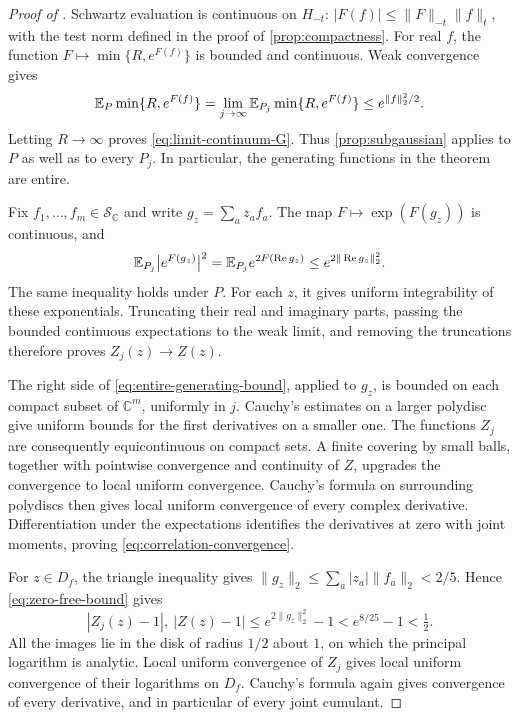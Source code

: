 \begin{proof}[Proof of ]
Schwartz evaluation is continuous on $H_{-t}$:
$|F(f)|\le\|F\|_{-t}\|f\|_t$, with the test norm
defined in the proof of \cref{prop:compactness}.
For real $f$, the function $F\mapsto\min\{R,e^{F(f)}\}$
is bounded and continuous. Weak convergence gives
\[
 \mathbb E_P\min\{R,e^{F(f)}\}
 =\lim_{j\to\infty}\mathbb E_{P_j}\min\{R,e^{F(f)}\}
 \le e^{\|f\|_2^2/2}.
\]
Letting $R\to\infty$ proves \eqref{eq:limit-continuum-G}.
Thus \cref{prop:subgaussian} applies to $P$ as well as to
every $P_j$. In particular, the generating functions in
the theorem are entire.

Fix $f_1,\ldots,f_m\in\mathcal S_{\mathbb C}$ and write
$g_z=\sum_a z_af_a$. The map
$F\mapsto\exp(F(g_z))$ is continuous, and
\begin{equation}\label{eq:exponential-ui}
 \mathbb E_{P_j}\bigl|e^{F(g_z)}\bigr|^2
 =\mathbb E_{P_j}e^{2F(\operatorname{Re}g_z)}
 \le e^{2\|\operatorname{Re}g_z\|_2^2}.
\end{equation}
The same inequality holds under $P$. For each $z$, it gives
uniform integrability of these exponentials. Truncating their
real and imaginary parts, passing the bounded continuous
expectations to the weak limit, and removing the truncations
therefore proves $Z_j(z)\to Z(z)$.

The right side of \eqref{eq:entire-generating-bound}, applied
to $g_z$, is bounded on each compact subset of $\mathbb C^m$,
uniformly in $j$. Cauchy's estimates on a larger polydisc give
uniform bounds for the first derivatives on a smaller one.
The functions $Z_j$ are consequently equicontinuous on compact
sets. A finite covering by small balls, together with pointwise
convergence and continuity of $Z$, upgrades the convergence to
local uniform convergence. Cauchy's formula on surrounding
polydiscs then gives local uniform convergence of every complex
derivative. Differentiation under the expectations identifies
the derivatives at zero with joint moments, proving
\eqref{eq:correlation-convergence}.

For $z\in D_f$, the triangle inequality gives
$\|g_z\|_2\le\sum_a|z_a|\|f_a\|_2<2/5$. Hence
\eqref{eq:zero-free-bound} gives
\[
 |Z_j(z)-1|,\ |Z(z)-1|
 \le e^{2\|g_z\|_2^2}-1
 < e^{8/25}-1<\tfrac12.
\]
All the images lie in the disk of radius $1/2$ about $1$,
on which the principal logarithm is analytic. Local uniform
convergence of $Z_j$ gives local uniform convergence of their
logarithms on $D_f$. Cauchy's formula again gives convergence
of every derivative, and in particular of every joint cumulant.
\end{proof}

